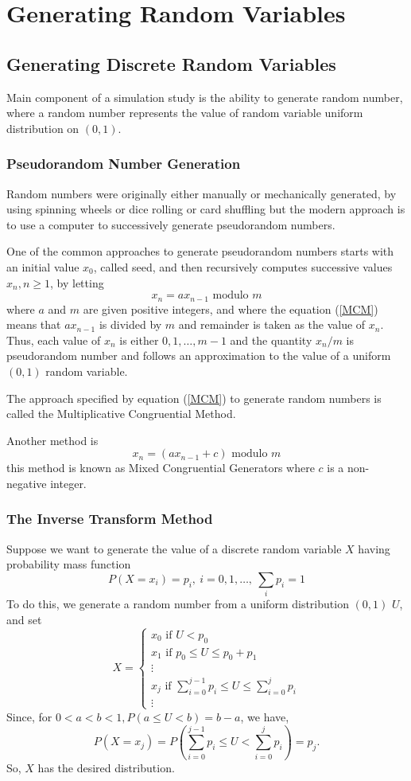 \chapter{Generating Random Variables}

\section{Generating Discrete Random Variables}

Main component of a simulation study is the ability to generate random number, where a random number represents the value of random variable uniform
distribution on $(0,1)$. 
\subsection{Pseudorandom Number Generation}
Random numbers were originally either manually or mechanically generated, by using spinning wheels or dice rolling or card shuffling 
but the modern approach is to use a computer to successively generate pseudorandom numbers.

One of the common approaches to generate pseudorandom numbers starts with an initial value $x_0$, called seed, and then recursively computes 
successive values $x_n, n\ge1$, by letting
\begin{equation}
    \label{MCM}
    x_n = a x_{n-1} \text{ modulo } m 
\end{equation}
where $a$ and $m$ are given positive integers, and where the equation (\ref{MCM}) means that $ax_{n-1}$ is divided by  $m$ and remainder is taken as the 
value of $x_n$. Thus, each value of $x_n$ is either $0,1, \ldots, m-1$ and the quantity $x_n / m$ is pseudorandom number and follows 
an approximation to the value of a uniform $(0,1)$ random variable.

The approach specified by equation (\ref{MCM}) to generate random numbers is called the Multiplicative Congruential Method.

Another method is 
\[
    x_n = (a x_{n-1}+c) \text{ modulo } m
\] 
this method is known as Mixed Congruential Generators where $c$ is a non-negative integer.

\subsection{The Inverse Transform Method}
Suppose we want to generate the value of a discrete random variable $X$ having probability mass function
 \[
     P(X=x_i)=p_i, \ i = 0,1, \ldots , \ \sum_ip_i =1
\] 
To do this, we generate a random number from a uniform distribution $(0,1)$ $U$, and set
 \[
X=
\begin{cases}
    x_0 \text{ if } U<p_0 \\
    x_1 \text{ if } p_0\le U\le p_0+p_1 \\ 
    \vdots \\
    x_j \text{ if } \sum_{i=0}^{j-1}p_i\le U\le \sum_{i=0}^{j}p_i\\ 
    \vdots
\end{cases}
\] 
Since, for $0<a<b<1, P(a\le U<b) = b-a$, we have,
\[
    P(X=x_j)=P\left( \sum_{i=0}^{j-1}p_i\le U< \sum_{i=0}^{j}p_i \right) = p_j
.\] 
So, $X$ has the desired distribution.

